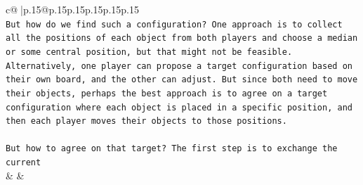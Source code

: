 \documentclass{article}
\begin{document}
{\begin{supertabular}{c@{$\;$}|p{.15\linewidth}@{}p{.15\linewidth}p{.15\linewidth}p{.15\linewidth}p{.15\linewidth}p{.15\linewidth}}
{{{\\ 
\texttt{But how do we find such a configuration? One approach is to collect all the positions of each object from both players and choose a median or some central position, but that might not be feasible. Alternatively, one player can propose a target configuration based on their own board, and the other can adjust. But since both need to move their objects, perhaps the best approach is to agree on a target configuration where each object is placed in a specific position, and then each player moves their objects to those positions.} \\
\\ 
\texttt{But how to agree on that target? The first step is to exchange the current} \\
            }
        }
    }
    & & \\ \\


\end{supertabular}}
\end{document}
